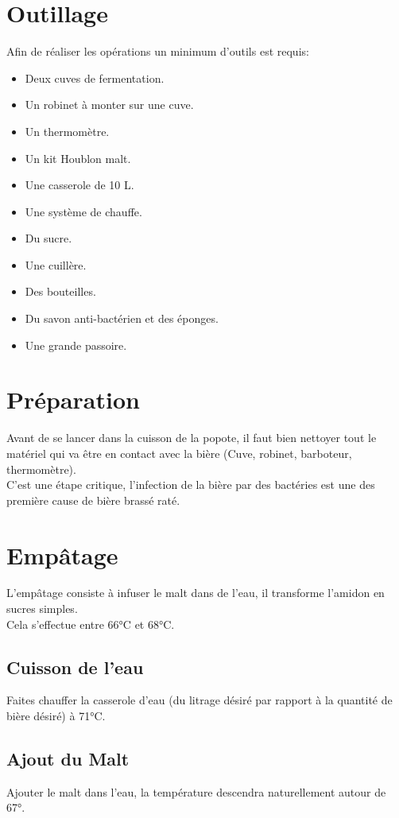 \documentclass[twoside,twocolumn]{report}
\begin{document}
		\section{Outillage}
		Afin de réaliser les opérations un minimum d'outils est requis: 
		\begin{itemize}
			\item Deux cuves de fermentation.
			\item Un robinet à monter sur une cuve.
			\item Un thermomètre.
			\item Un kit Houblon malt.
			\item Une casserole de 10 L.
			\item Une système de chauffe.
			\item Du sucre.
			\item Une cuillère.
			\item Des bouteilles.	
			\item Du savon anti-bactérien et des éponges.
			\item Une  grande passoire.	 
		\end{itemize}
		
		\section{Préparation}
		Avant de se lancer dans la cuisson de la popote, il faut bien nettoyer tout le matériel qui va être en contact avec la bière (Cuve, robinet, barboteur, thermomètre).\\
		C'est une étape critique, l'infection de la bière par des bactéries est une des première cause de bière brassé raté.
		
		\section{Empâtage}
		L'empâtage consiste à infuser le malt dans de l'eau, il transforme l'amidon en sucres simples.\\
		Cela s'effectue entre 66°C et 68°C.
		\subsection{Cuisson de l'eau}
		Faites chauffer la casserole d'eau (du litrage désiré par rapport à la quantité de bière désiré) à 71°C.\\
		\subsection{Ajout du Malt}
		Ajouter le malt dans l'eau, la température descendra naturellement autour de 67°.
\end{document}
